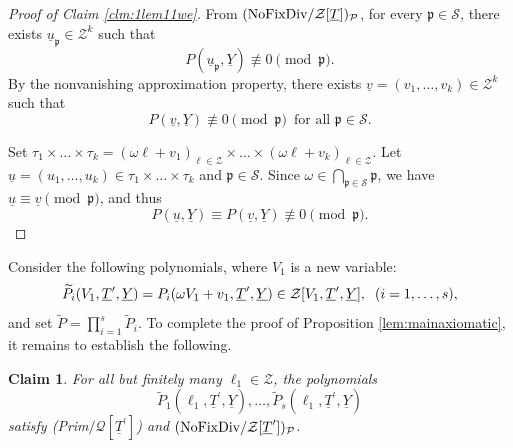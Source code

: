 \documentclass[11pt,a4paper,reqno]{amsart}
\newtheorem{claim}{Claim}
\theoremstyle{definition}
\begin{document}
\begin{proof}[Proof of Claim \ref{clm:1lem11we}]
From $\hbox{\rm (NoFixDiv}/{\mathcal Z}[\underline T])_{\mathcal P}$, for every $\mathfrak{p} \in \mathcal{S}$,
there exists 
$\underline u_{\mathfrak{p}} \in \mathcal{Z}^k$ such that 
\begin{equation}\label{eq:pcongr1we}
P(\underline u_{\mathfrak{p}},\underline{Y})\not\equiv 0 \pmod{\mathfrak{p}}.
\end{equation}
By the nonvanishing approximation property, there exists $\underline{v}=(v_1,\dots,v_k) \in \mathcal{Z}^k$ such that
$$
P(\underline{v},\underline{Y}) \not\equiv 0 \pmod{\mathfrak{p}}\,\,\, \textrm{for all}\,\, \mathfrak{p} \in \mathcal{S}.
$$ 

Set $\tau_1 \times \dots \times \tau_k=(\omega \ell + v_{1})_{\ell\in \mathcal{Z}} \times \dots \times (\omega \ell + v_{k})_{\ell\in \mathcal{Z}}$. Let $\underline{u}=(u_1,\dots,u_k) \in \tau_1 \times \dots \times \tau_k$ and $\mathfrak{p} \in \mathcal{S}$. Since $\omega \in \bigcap_{\mathfrak{p} \in \mathcal{S}}\mathfrak{p} $, we have $\underline{u}\equiv \underline{v} \pmod{\mathfrak{p}}$, and thus
\begin{equation}
P(\underline u,\underline{Y})\equiv P(\underline{v},\underline{Y})\not\equiv 0 \pmod{\mathfrak{p}}.
\end{equation}
\end{proof}
Consider the following polynomials, where $V_1$ is a new variable:
$$\widetilde P_i (V_1,\underline{T}^\prime, \underline{Y})= P_i(\omega V_1+v_1, \underline{T}^\prime, \underline{Y}) \in \mathcal{Z}[V_1,\underline{T}^\prime,\underline{Y}],\hskip 2mm  (i=1,\dots,s),
$$ and set $\widetilde P = \prod_{i=1}^s \widetilde P_i$. To complete the proof of Proposition \ref{lem:mainaxiomatic}, it remains to establish the following.
\begin{claim}\label{clm:existinfmanywe}
For all but finitely many $\ell_1 \in \mathcal{Z}$, the polynomials $$\widetilde{P}_1(\ell_1,\underline{T}^\prime,\underline{Y}),\dots,\widetilde{P}_s(\ell_1,\underline{T}^\prime,\underline{Y})$$ satisfy \hbox{\rm (Prim$/{\mathcal Q}[\underline T^\prime]$)} and $\hbox{\rm (NoFixDiv}/{\mathcal Z}[\underline T^\prime])_{\mathcal P}$.
\end{claim}
\end{document}
